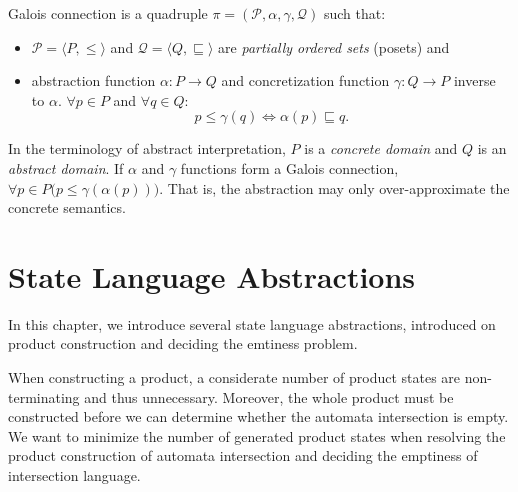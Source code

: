 \begin{definition} \hfill \newline
Galois connection is a quadruple $\pi = (\mathcal{P}, \alpha, \gamma, \mathcal{Q})$ such that:

\begin{itemize}
    \item $\mathcal{P} = \langle P, \leq \rangle$ and $\mathcal{Q} = \langle Q, \sqsubseteq \rangle$ are \emph{partially ordered sets} (posets) and
    \item abstraction function $\alpha : P \rightarrow Q$ and concretization function $\gamma : Q \rightarrow P$ inverse to $\alpha$. $\forall p \in P$ and $\forall q \in Q$:
    \[
        p \leq \gamma(q) \Leftrightarrow \alpha(p) \sqsubseteq q \text{.}
    \]
\end{itemize}

\end{definition}

In the terminology of abstract interpretation, $P$ is a \emph{concrete domain} and $Q$ is an \emph{abstract domain}. If $\alpha$ and $\gamma$ functions form a Galois connection, $\forall p \in P \bigr( p \leq \gamma(\alpha(p)) \bigr)$. That is, the abstraction may only over-approximate the concrete semantics.


\chapter{State Language Abstractions}

In this chapter, we introduce several state language abstractions, introduced on product construction and deciding the emtiness problem.


When constructing a product, a considerate number of product states are non-terminating and thus unnecessary. Moreover, the whole product must be constructed before we can determine whether the automata intersection is empty. We want to minimize the number of generated product states when resolving the product construction of automata intersection and deciding the emptiness of intersection language.

